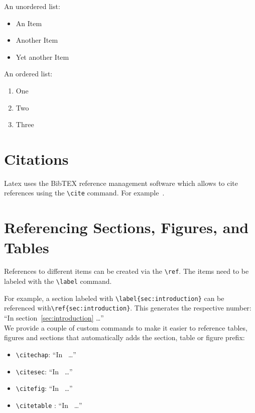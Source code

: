  An unordered list:
\begin{itemize}
  \item An Item
  \item Another Item
  \item Yet another Item
\end{itemize}

 An ordered list:
\begin{enumerate}
  \item One
  \item Two
  \item Three
\end{enumerate}

\section{Citations}

Latex uses the BibTEX reference management software which allows to cite references using the \verb|\cite| command.
For example~\cite{Turing1936}.


\section{Referencing Sections, Figures, and Tables}

References to different items can be created via the  \verb|\ref|.
The items need to be labeled with the \verb|\label| command.

For example, a section labeled with  \verb|\label{sec:introduction}| can be referenced with\newline \verb|\ref{sec:introduction}|. This generates the respective number: ``In section~\ref{sec:introduction} \ldots''\\

\bigskip
We provide a couple of custom commands to make it easier to reference tables, figures and sections that automatically adds the section, table or figure prefix: 

\begin{itemize}
    \item \verb|\citechap|:    ``In~ \ldots''
    \item \verb|\citesec|:    ``In~ \ldots''
    \item \verb|\citefig|:    ``In~ \ldots''
    \item \verb|\citetable| : ``In~ \ldots''

\end{itemize}



